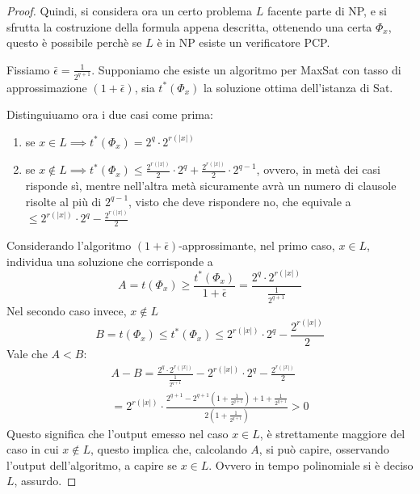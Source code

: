 \begin{proof}
    Quindi, si considera ora un certo problema $L$ facente parte di NP, e si sfrutta 
    la costruzione della formula appena descritta, ottenendo una certa $\Phi_x$, 
    questo è possibile perchè se $L$ è in NP esiste un verificatore PCP.
    
    Fissiamo $\bar{\epsilon} = \frac{1}{2^{q+1}}$.
    Supponiamo che esiste un algoritmo per MaxSat con tasso di approssimazione $(1+\bar{\epsilon})$, 
    sia $t^*(\Phi_x)$ la soluzione ottima dell'istanza di Sat.

    Distinguiuamo ora i due casi come prima:
    \begin{enumerate}
        \item se $x \in L \implies t^*(\Phi_x) = 2^q \cdot 2^{r(|x|)}$
        \item se $x \notin L \implies t^*(\Phi_x) \leq \frac{2^{r(|x|)}}{2} \cdot 2^q + \frac{2^{r(|x|)}}{2} 
        \cdot 2^{q-1}$, 
        ovvero, in metà dei casi risponde sì, mentre nell'altra metà sicuramente avrà un numero 
        di clausole risolte al più di $2^{q-1}$, visto che deve rispondere no, che 
        equivale a $\leq 2^{r(|x|)} \cdot 2^q - \frac{2^{r(|x|)}}{2}$
    \end{enumerate}

    Considerando l'algoritmo $(1+\bar{\epsilon})$-approssimante, nel primo caso, $x \in L$, individua una soluzione 
    che corrisponde a
    $$A = t(\Phi_x) \geq \frac{t^*(\Phi_x)}{1+\bar{\epsilon}} = \frac{2^q \cdot 2^{r(|x|)}}{\frac{1}{2^{q+1}}}$$
    Nel secondo caso invece, $x \notin L$
    $$B = t(\Phi_x) \leq t^*(\Phi_x) \leq 2^{r(|x|)} \cdot 2^q - \frac{2^{r(|x|)}}{2}$$
    Vale che $A < B$:
    \begin{equation}
        \begin{aligned}
            A - B = \frac{2^q \cdot 2^{r(|x|)}}{\frac{1}{2^{q+1}}}- 2^{r(|x|)} \cdot 2^q - \frac{2^{r(|x|)}}{2}\\
            = 2^{r(|x|)} \cdot \frac{2^{q+1} - 2^{q+1}(1+ \frac{1}{2^{q+1}}) + 1 + \frac{1}{2^{q+1}}}{2(1+ \frac{1}{2^{q+1}})} > 0
        \end{aligned}
    \end{equation}
    Questo significa che l'output emesso nel caso $x \in L$, è strettamente maggiore del caso in cui
    $x \notin L$, questo implica che, calcolando $A$, si può capire, osservando l'output dell'algoritmo, 
    a capire se $x \in L$. Ovvero in tempo polinomiale si è deciso $L$, assurdo.
\end{proof}


